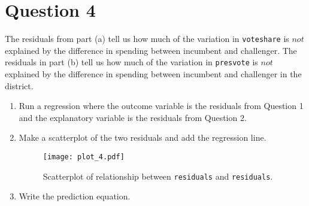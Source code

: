 \documentclass[12pt,letterpaper]{article}
\begin{document}
\vspace{.5cm}
\section*{Question 4}
\noindent The residuals from part (a) tell us how much of the variation in \texttt{voteshare} is $not$ explained by the difference in spending between incumbent and challenger. The residuals in part (b) tell us how much of the variation in \texttt{presvote} is $not$ explained by the difference in spending between incumbent and challenger in the district.
	\begin{enumerate}
		\item Run a regression where the outcome variable is the residuals from Question 1 and the explanatory variable is the residuals from Question 2.	
		
		\vspace{.15cm}
		 
		\vspace{.15cm}
		
		\item Make a scatterplot of the two residuals and add the regression line. 	
		\vspace{.15cm}
		 
		\vspace{.15cm}
		\begin{figure}[h!]\centering
			
			\caption{\footnotesize Scatterplot of relationship between \texttt{residuals} and \texttt{residuals}.}
			\label{fig:plot_4}
			\texttt{[image: plot\_4.pdf]}
		\end{figure}
		\item Write the prediction equation.
		
		\vspace{.15cm}
		 
		\vspace{.15cm}
		
	\end{enumerate}
	
\vspace{.5cm}
\end{document}
